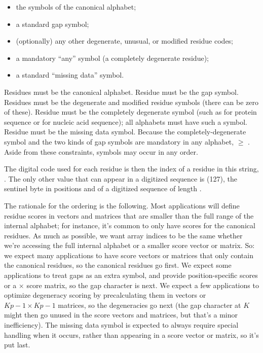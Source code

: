 \begin{itemize}
 \item the  symbols of the canonical alphabet;
 \item a standard gap symbol;
 \item (optionally) any other degenerate, unusual, or modified residue codes;
 \item a mandatory ``any'' symbol (a completely degenerate residue);
 \item a standard ``missing data'' symbol.
\end{itemize}

Residues  must be the canonical alphabet.  Residue
 must be the gap symbol.  Residues  must be
the degenerate and modified residue symbols (there can be zero of
these). Residue  must be the completely degenerate symbol
(such as  for protein sequence or  for nucleic acid
sequence); all alphabets must have such a symbol. Residue 
must be the missing data symbol.  Because the completely-degenerate
symbol and the two kinds of gap symbols are mandatory in any alphabet,
 $\geq$ . Aside from these constraints, symbols
may occur in any order.

The digital code used for each residue is then the index of a residue
in this string, . The only other value that can appear
in a digitized sequence is  (127), the sentinel
byte in positions  and  of a digitized sequence of
length . 

The rationale for the ordering is the following. Most applications
will define residue scores in vectors and matrices that are smaller
than the full range of the internal alphabet; for instance, it's
common to only have  scores for the canonical residues.  As
much as possible, we want array indices to be the same whether we're
accessing the full internal alphabet or a smaller score vector or
matrix. So: we expect many applications to have score vectors or
matrices that only contain the  canonical residues, so the
canonical residues go first.  We expect some applications to treat
gaps as an extra symbol, and provide  position-specific
scores or a  $\times$  score matrix, so the gap
character is next. We expect a few applications to optimize degeneracy
scoring by precalculating them in  vectors or $Kp-1 \times Kp-1$
matrices, so the degeneracies go next (the gap character at $K$ might
then go unused in the score vectors and matrices, but that's a minor
inefficiency).  The missing data symbol is expected to always require
special handling when it occurs, rather than appearing in a score
vector or matrix, so it's put last.

